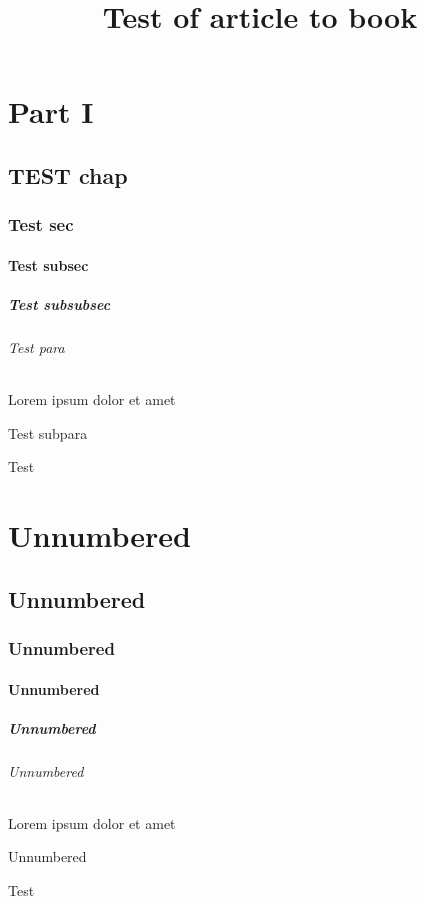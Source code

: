 \documentclass{article}
\title{Test of article to book}
\begin{document}
    \tableofcontents
    
    \part{Part I}
    \chapter{TEST chap}
    \section{Test sec}
    \subsection{Test subsec}
    \subsubsection{Test subsubsec}
    \paragraph{Test para} Lorem ipsum dolor et amet
    \subparagraph{Test subpara}
    Test

    \part*{Unnumbered}
    \chapter*{Unnumbered}
    \section*{Unnumbered}
    \subsection*{Unnumbered}
    \subsubsection*{Unnumbered}
    \paragraph*{Unnumbered} Lorem ipsum dolor et amet
    \subparagraph*{Unnumbered}
    Test
\end{document}
